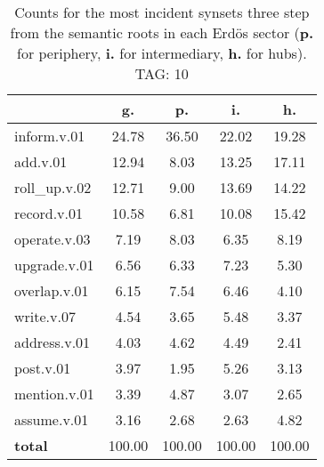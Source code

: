 \begin{table}[h!]
\begin{center}
\begin{tabular}{| l || c | c | c | c |}\hline
 & {\bf g.} & {\bf p.} & {\bf i.} & {\bf h.} \\\hline\hline
inform.v.01 & 24.78  & 36.50  & 22.02  & 19.28 \\\hline
add.v.01 & 12.94  & 8.03  & 13.25  & 17.11 \\\hline
roll\_up.v.02 & 12.71  & 9.00  & 13.69  & 14.22 \\\hline
record.v.01 & 10.58  & 6.81  & 10.08  & 15.42 \\\hline
operate.v.03 & 7.19  & 8.03  & 6.35  & 8.19 \\\hline
upgrade.v.01 & 6.56  & 6.33  & 7.23  & 5.30 \\\hline
overlap.v.01 & 6.15  & 7.54  & 6.46  & 4.10 \\\hline
write.v.07 & 4.54  & 3.65  & 5.48  & 3.37 \\\hline
address.v.01 & 4.03  & 4.62  & 4.49  & 2.41 \\\hline
post.v.01 & 3.97  & 1.95  & 5.26  & 3.13 \\\hline
mention.v.01 & 3.39  & 4.87  & 3.07  & 2.65 \\\hline
assume.v.01 & 3.16  & 2.68  & 2.63  & 4.82 \\\hline\hline
{{\bf total}} & 100.00  & 100.00  & 100.00  & 100.00 \\\hline
\end{tabular}
\caption{Counts for the most incident synsets three step from the semantic roots in each Erd\"os sector ({\bf p.} for periphery, {\bf i.} for intermediary, {\bf h.} for hubs). TAG: 10}
\end{center}
\end{table}